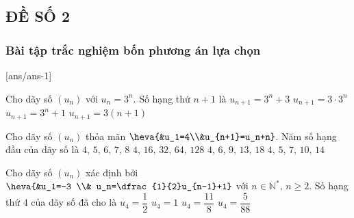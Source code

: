 \setcounter{section}{0}
\setcounter{subsubsection}{0}
\setcounter{ex}{0}
\setcounter{bt}{0}
 
\subsection{ĐỀ SỐ 2}
\subsubsection{Bài tập trắc nghiệm bốn phương án lựa chọn}
[ans/ans-1]
\begin{ex}%
	Cho dãy số $(u_n)$ với $u_n=3^n$. Số hạng thứ $n+1$ là
	\choice
	{$u_{n+1}=3^n+3$}
	{\True $u_{n+1}=3\cdot 3^n$}
	{$u_{n+1}=3^n+1$}
	{$u_{n+1}=3(n+1)$}
\end{ex}
\begin{ex}%
	Cho dãy số $(u_n)$ thỏa mãn $\heva{&u_1=4\\&u_{n+1}=u_n+n}$. Năm số hạng đầu của dãy số là
	\choice
	{$4,\,5,\,6,\,7,\,8$}
	{$4,\,16,\,32,\,64,\,128$}
	{$4,\,6,\,9,\,13,\,18$}
	{\True $4,\,5,\,7,\,10,\,14$}
\end{ex}
\begin{ex}%
	Cho dãy số $(u_n)$ xác định bởi $\heva{&u_1=-3  \\& u_n=\dfrac{1}{2}u_{n-1}+1}$ với $n\in \mathbb{N}^*,\,n\ge 2$. Số hạng thứ $4$ của dãy số đã cho là
	\choice
	{$u_4=\dfrac{1}{2}$}
	{$u_4=1$}
	{\True $u_4=\dfrac{11}{8}$}
	{$u_4=\dfrac{5}{88}$}
\end{ex}
